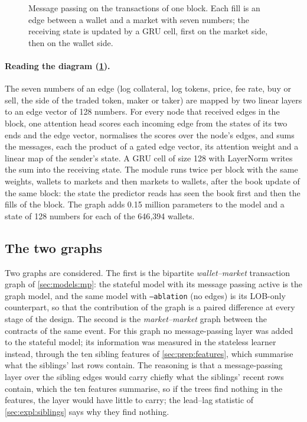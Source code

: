 \begin{figure}[t]
\centering
\resizebox{\textwidth}{!}{}
\caption{Message passing on the transactions of one block.  Each fill is an edge between
a wallet and a market with seven numbers; the receiving state is updated by a GRU cell,
first on the market side, then on the wallet side.}
\label{fig:models:graph}
\end{figure}

\paragraph{Reading the diagram (\cref{fig:models:graph}).}  The seven numbers of an edge
(log collateral, log tokens, price, fee rate, buy or sell, the side of the traded token,
maker or taker) are mapped by two linear layers to an edge vector of 128 numbers.  For
every node that received edges in the block, one attention head scores each incoming edge
from the states of its two ends and the edge vector, normalises the scores over the node's
edges, and sums the messages, each the product of a gated edge vector, its attention
weight and a linear map of the sender's state.  A GRU cell of size 128 with LayerNorm
writes the sum into the receiving state.  The module runs twice per block with the same
weights, wallets to markets and then markets to wallets, after the book update of the
same block: the state the predictor reads has seen the book first and then the fills of
the block.  The graph adds
0.15 million parameters to the model and a state of 128 numbers for each of the 646{,}394
wallets.

\subsection{The two graphs}
\label{sec:models:twographs}

Two graphs are considered.  The first is the bipartite \emph{wallet--market} transaction
graph of \cref{sec:models:mp}: the stateful model with its message passing active is the
graph model, and the same model with \texttt{--ablation} (no edges) is its LOB-only
counterpart, so that the contribution of the graph is a paired difference at every stage of
the design.  The second is the \emph{market--market} graph between the contracts of the same
event.  For this graph no message-passing layer was added to the stateful model; its
information was measured in the stateless learner instead, through the ten sibling features
of \cref{sec:prep:features}, which summarise what the siblings' last rows contain.  The
reasoning is that a message-passing layer over the sibling edges would carry chiefly what
the siblings' recent rows contain, which the ten features summarise, so if the trees find
nothing in the features, the layer would have little to carry; the lead--lag statistic of \cref{sec:expl:siblings} says why
they find nothing.

